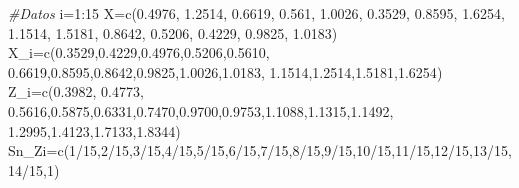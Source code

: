 \documentclass[
  a4paper,
  oneside,
  openany]{book}
\newenvironment{Shaded}{\begin{snugshade}}{\end{snugshade}}
\newcommand{\CommentTok}[1]{\textcolor[rgb]{0.56,0.35,0.01}{\textit{#1}}}
\newcommand{\DecValTok}[1]{\textcolor[rgb]{0.00,0.00,0.81}{#1}}
\newcommand{\FloatTok}[1]{\textcolor[rgb]{0.00,0.00,0.81}{#1}}
\newcommand{\FunctionTok}[1]{\textcolor[rgb]{0.00,0.00,0.00}{#1}}
\newcommand{\NormalTok}[1]{#1}
\newcommand{\OtherTok}[1]{\textcolor[rgb]{0.56,0.35,0.01}{#1}}
\newcommand{\SpecialCharTok}[1]{\textcolor[rgb]{0.00,0.00,0.00}{#1}}
\begin{document}
\begin{Shaded}
\begin{Highlighting}[]
\CommentTok{\#Datos}
\NormalTok{i}\OtherTok{=}\DecValTok{1}\SpecialCharTok{:}\DecValTok{15}
\NormalTok{X}\OtherTok{=}\FunctionTok{c}\NormalTok{(}\FloatTok{0.4976}\NormalTok{, }\FloatTok{1.2514}\NormalTok{, }\FloatTok{0.6619}\NormalTok{, }\FloatTok{0.561}\NormalTok{, }\FloatTok{1.0026}\NormalTok{, }\FloatTok{0.3529}\NormalTok{, }\FloatTok{0.8595}\NormalTok{, }\FloatTok{1.6254}\NormalTok{,}
                             \FloatTok{1.1514}\NormalTok{, }\FloatTok{1.5181}\NormalTok{, }\FloatTok{0.8642}\NormalTok{, }\FloatTok{0.5206}\NormalTok{, }\FloatTok{0.4229}\NormalTok{, }\FloatTok{0.9825}\NormalTok{, }\FloatTok{1.0183}\NormalTok{)}
\NormalTok{X\_i}\OtherTok{=}\FunctionTok{c}\NormalTok{(}\FloatTok{0.3529}\NormalTok{,}\FloatTok{0.4229}\NormalTok{,}\FloatTok{0.4976}\NormalTok{,}\FloatTok{0.5206}\NormalTok{,}\FloatTok{0.5610}\NormalTok{, }\FloatTok{0.6619}\NormalTok{,}\FloatTok{0.8595}\NormalTok{,}\FloatTok{0.8642}\NormalTok{,}\FloatTok{0.9825}\NormalTok{,}\FloatTok{1.0026}\NormalTok{,}\FloatTok{1.0183}\NormalTok{,}
      \FloatTok{1.1514}\NormalTok{,}\FloatTok{1.2514}\NormalTok{,}\FloatTok{1.5181}\NormalTok{,}\FloatTok{1.6254}\NormalTok{)}
\NormalTok{Z\_i}\OtherTok{=}\FunctionTok{c}\NormalTok{(}\FloatTok{0.3982}\NormalTok{, }\FloatTok{0.4773}\NormalTok{, }\FloatTok{0.5616}\NormalTok{,}\FloatTok{0.5875}\NormalTok{,}\FloatTok{0.6331}\NormalTok{,}\FloatTok{0.7470}\NormalTok{,}\FloatTok{0.9700}\NormalTok{,}\FloatTok{0.9753}\NormalTok{,}\FloatTok{1.1088}\NormalTok{,}\FloatTok{1.1315}\NormalTok{,}\FloatTok{1.1492}\NormalTok{,}
      \FloatTok{1.2995}\NormalTok{,}\FloatTok{1.4123}\NormalTok{,}\FloatTok{1.7133}\NormalTok{,}\FloatTok{1.8344}\NormalTok{) }
\NormalTok{Sn\_Zi}\OtherTok{=}\FunctionTok{c}\NormalTok{(}\DecValTok{1}\SpecialCharTok{/}\DecValTok{15}\NormalTok{,}\DecValTok{2}\SpecialCharTok{/}\DecValTok{15}\NormalTok{,}\DecValTok{3}\SpecialCharTok{/}\DecValTok{15}\NormalTok{,}\DecValTok{4}\SpecialCharTok{/}\DecValTok{15}\NormalTok{,}\DecValTok{5}\SpecialCharTok{/}\DecValTok{15}\NormalTok{,}\DecValTok{6}\SpecialCharTok{/}\DecValTok{15}\NormalTok{,}\DecValTok{7}\SpecialCharTok{/}\DecValTok{15}\NormalTok{,}\DecValTok{8}\SpecialCharTok{/}\DecValTok{15}\NormalTok{,}\DecValTok{9}\SpecialCharTok{/}\DecValTok{15}\NormalTok{,}\DecValTok{10}\SpecialCharTok{/}\DecValTok{15}\NormalTok{,}\DecValTok{11}\SpecialCharTok{/}\DecValTok{15}\NormalTok{,}\DecValTok{12}\SpecialCharTok{/}\DecValTok{15}\NormalTok{,}\DecValTok{13}\SpecialCharTok{/}\DecValTok{15}\NormalTok{,}\DecValTok{14}\SpecialCharTok{/}\DecValTok{15}\NormalTok{,}\DecValTok{1}\NormalTok{)}

\end{Highlighting}
\end{Shaded}
\end{document}

